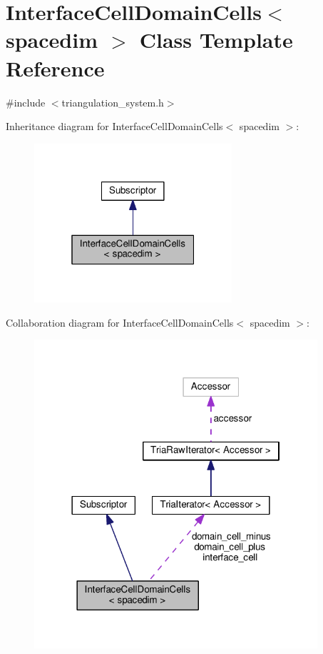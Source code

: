 \hypertarget{class_interface_cell_domain_cells}{}\section{Interface\+Cell\+Domain\+Cells$<$ spacedim $>$ Class Template Reference}
\label{class_interface_cell_domain_cells}


{\ttfamily \#include $<$triangulation\+\_\+system.\+h$>$}



Inheritance diagram for Interface\+Cell\+Domain\+Cells$<$ spacedim $>$\+:
\nopagebreak
\begin{figure}[H]
\begin{center}
\leavevmode
\includegraphics[width=208pt]{class_interface_cell_domain_cells__inherit__graph}
\end{center}
\end{figure}


Collaboration diagram for Interface\+Cell\+Domain\+Cells$<$ spacedim $>$\+:
\nopagebreak
\begin{figure}[H]
\begin{center}
\leavevmode
\includegraphics[width=298pt]{class_interface_cell_domain_cells__coll__graph}
\end{center}
\end{figure}
